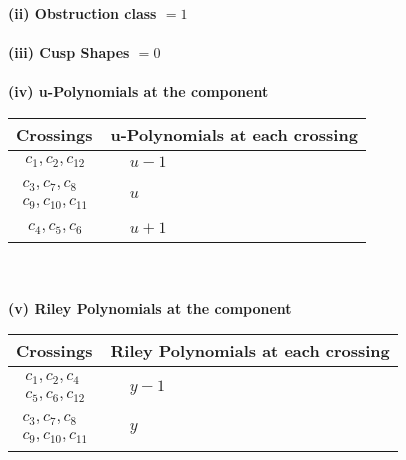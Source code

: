 \documentclass[1p]{elsarticle_modified}
\theoremstyle{definition}
\begin{document}
\flushleft \textbf{(ii) Obstruction class $= 1$}\\~\\
\flushleft \textbf{(iii) Cusp Shapes $= 0$}\\~\\
\newpage\renewcommand{\arraystretch}{1}
\flushleft \textbf{(iv) u-Polynomials at the component}\newline \\
\begin{tabular}{m{50pt}|m{274pt}}
Crossings & \hspace{64pt}u-Polynomials at each crossing \\
\hline $$\begin{aligned}c_{1},c_{2},c_{12}\end{aligned}$$&$\begin{aligned}
&u-1
\end{aligned}$\\
\hline $$\begin{aligned}c_{3},c_{7},c_{8}\\c_{9},c_{10},c_{11}\end{aligned}$$&$\begin{aligned}
&u
\end{aligned}$\\
\hline $$\begin{aligned}c_{4},c_{5},c_{6}\end{aligned}$$&$\begin{aligned}
&u+1
\end{aligned}$\\
\hline
\end{tabular}\\~\\
\newpage\renewcommand{\arraystretch}{1}
\flushleft \textbf{(v) Riley Polynomials at the component}\newline \\
\begin{tabular}{m{50pt}|m{274pt}}
Crossings & \hspace{64pt}Riley Polynomials at each crossing \\
\hline $$\begin{aligned}c_{1},c_{2},c_{4}\\c_{5},c_{6},c_{12}\end{aligned}$$&$\begin{aligned}
&y-1
\end{aligned}$\\
\hline $$\begin{aligned}c_{3},c_{7},c_{8}\\c_{9},c_{10},c_{11}\end{aligned}$$&$\begin{aligned}
&y
\end{aligned}$\\
\hline
\end{tabular}\\~\\
\end{document}
